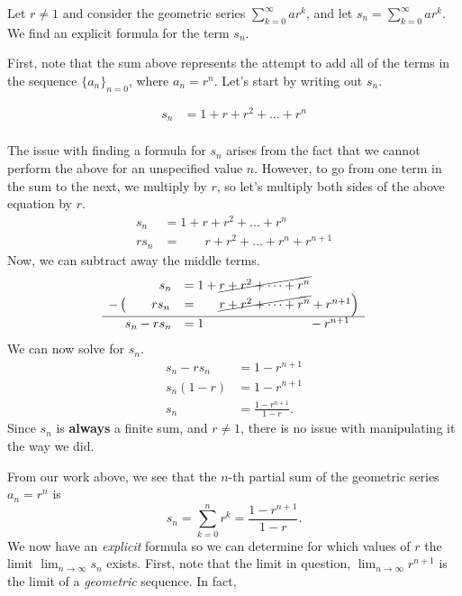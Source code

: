 \documentclass{ximera}
\begin{document}
\begin{model}
 Let $r \neq 1$ and consider the geometric series $\sum_{k=0}^\infty a r^k$, and let $s_n = \sum_{k=0}^{\infty} a r^k $.  We find an explicit formula for the term $s_n$.
  
  \begin{explanation}
First, note that the sum above represents the attempt to add all of the terms in the sequence $\{a_n\}_{n=0}$, where $a_n =  r^n$.  Let's start by writing out $s_n$.  

    \begin{align*}
      s_n   &= 1 + r + r^2 + \dots + r^n\\
    \end{align*}

The issue with finding a formula for $s_n$ arises from the fact that we cannot perform the above for an unspecified value $n$.  However, to go from one term in the sum to the next, we multiply by $r$, so let's multiply both sides of the above equation by $r$.
    \begin{align*}
      s_n   &= 1 + r + r^2 + \dots + r^n\\
      r s_n &= ~ \phantom{ 1 + } r + r^2 + \dots + r^n + r^{n+1}
    \end{align*}
Now, we can subtract away the middle terms.
 \[     \begin{array}{rl}
      s_n   &= 1 + \cancel{ r + r^2 + \dots + r^n}\\
 -\left(  \phantom{ r^{n+1}} r s_n \right.&=~ \left. \phantom{  1 +  } \cancel{r + r^2 + \dots + r^n} + r^{n+1}\right) \\
 \hline 
     s_n - r s_n &= 1 \phantom{  +  r + r^2 + \dots + r^n } ~ - r^{n+1}\\
    \end{array}
 \]   
 We can now solve for $s_n$.
     \begin{align*}
      s_n - r s_n &= 1 - r^{n+1}\\
      s_n(1-r)    &= 1 - r^{n+1}\\
      s_n &= \frac{1 - r^{n+1}}{1-r}.
    \end{align*}
    Since $s_n$ is \textbf{always} a finite sum, and $r \ne 1$, there is no issue
    with manipulating it the way we did.
  \end{explanation}
\end{model}

From our work above, we see that the $n$-th partial sum of the
geometric series $a_n = r^n$ is
\[
s_n = \sum_{k=0}^{n} r^k= \frac{1 - r^{n+1}}{1-r}.
\]
We now have an \emph{explicit} formula so we can determine for which values of $r$ the limit $\lim_{n \to \infty} s_n$ exists.  First, note that the limit in question, $\lim_{n \to \infty} r^{n+1}$ is the limit of a \emph{geometric} sequence.  In fact, 
\end{document}
